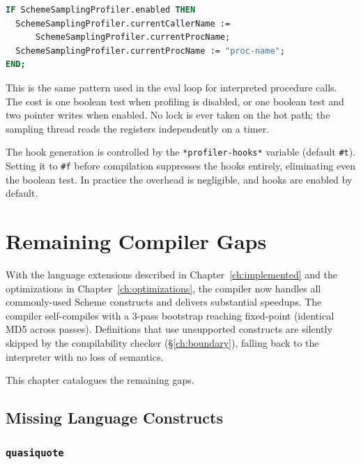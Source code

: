 \documentclass[12pt]{report}
\begin{document}
\begin{lstlisting}[language=Modula3]
IF SchemeSamplingProfiler.enabled THEN
  SchemeSamplingProfiler.currentCallerName :=
      SchemeSamplingProfiler.currentProcName;
  SchemeSamplingProfiler.currentProcName := "proc-name";
END;
\end{lstlisting}

\noindent
This is the same pattern used in the eval loop for interpreted
procedure calls.  The cost is one boolean test when profiling is
disabled, or one boolean test and two pointer writes when enabled.
No lock is ever taken on the hot path; the sampling thread reads the
registers independently on a timer.

The hook generation is controlled by the \texttt{*profiler-hooks*}
variable (default \texttt{\#t}).  Setting it to \texttt{\#f} before
compilation suppresses the hooks entirely, eliminating even the
boolean test.  In practice the overhead is negligible, and hooks are
enabled by default.


\chapter{Remaining Compiler Gaps}
\label{ch:gaps}

With the language extensions described in
Chapter~\ref{ch:implemented} and the optimizations in
Chapter~\ref{ch:optimizations}, the compiler now handles all
commonly-used Scheme constructs and delivers substantial speedups.
The compiler self-compiles with a 3-pass bootstrap reaching
fixed-point (identical MD5 across passes).
Definitions that use unsupported
constructs are silently skipped by the compilability checker
(\S\ref{ch:boundary}), falling back to the interpreter with no
loss of semantics.

This chapter catalogues the remaining gaps.

\section{Missing Language Constructs}
\label{sec:gaps-lang}

\subsection{\texttt{quasiquote}}
\label{sec:gap-quasiquote}
\end{document}
